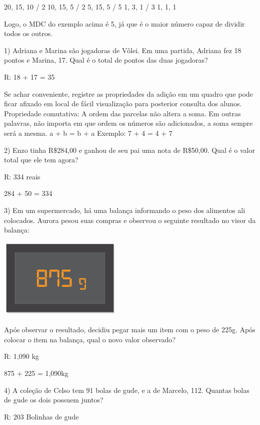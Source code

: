 20, 15, 10 / 2 10, 15, 5 / 2 5, 15, 5 / 5 1, 3, 1 / 3 1, 1, 1

Logo, o MDC do exemplo acima é 5, já que é o maior número capaz de
dividir todos os outros.


1) Adriana e Marina são jogadoras de Vôlei. Em uma partida, Adriana fez
18 pontos e Marina, 17. Qual é o total de pontos das duas jogadoras?

R: 18 + 17 = 35

Se achar conveniente, registre as propriedades da adição em um quadro
que pode ficar afixado em local de fácil visualização para posterior
consulta dos alunos. Propriedade comutativa: A ordem das parcelas não
altera a soma. Em outras palavras, não importa em que ordem os números
são adicionados, a soma sempre será a mesma. a + b = b + a Exemplo: 7 +
4 = 4 + 7

2) Enzo tinha R\$284,00 e ganhou de seu pai uma nota de R\$50,00. Qual é
o valor total que ele tem agora?

R: 334 reais

284 + 50 = 334

3) Em um supermercado, há uma balança informando o peso dos alimentos
ali colocados. Aurora pesou suas compras e observou o seguinte resultado
no visor da balança:

\includegraphics[width=2.33333in,height=1.53125in]{./imgSAEB_6_MAT/media/image23.png}

Após observar o resultado, decidiu pegar mais um item com o peso de
225g. Após colocar o item na balança, qual o novo valor observado?

R: 1,090 kg

875 + 225 = 1,090kg

4) A coleção de Celso tem 91 bolas de gude, e a de Marcelo, 112. Quantas
bolas de gude os dois possuem juntos?


R: 203 Bolinhas de gude

